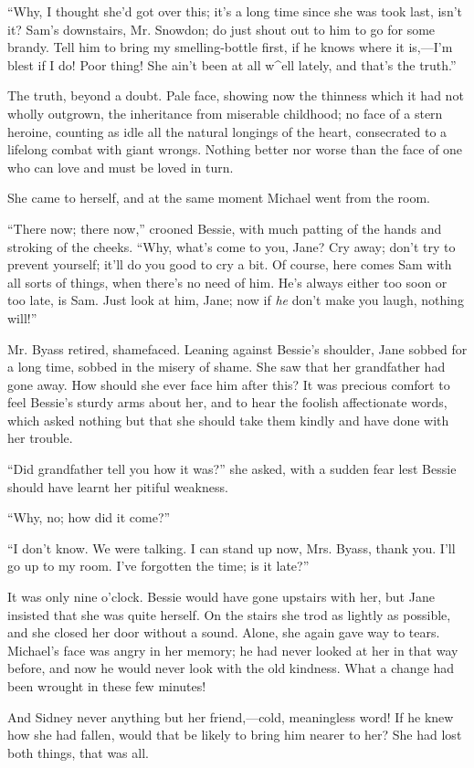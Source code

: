 ``Why, I thought she'd got over this; it's a long time since she was
took last, isn't it? Sam's downstairs, Mr. Snowdon; do just shout out to
him to go for some brandy. Tell him to bring my smelling-bottle first,
if he knows where it is,---I'm blest if I do! Poor thing! She ain't been
at all w\^{}ell lately, and that's the truth.''

The truth, beyond a doubt. Pale face, showing now the thinness which it
had not wholly outgrown, the inheritance from
{\protect\hypertarget{134}{}{}}miserable childhood; no face of a stern
heroine, counting as idle all the natural longings of the heart,
consecrated to a lifelong combat with giant wrongs. Nothing better nor
worse than the face of one who can love and must be loved in turn.

She came to herself, and at the same moment Michael went from the room.

``There now; there now,'' crooned Bessie, with much patting of the hands
and stroking of the cheeks. ``Why, what's come to you, Jane? Cry away;
don't try to prevent yourself; it'll do you good to cry a bit. Of
course, here comes Sam with all sorts of things, when there's no need of
him. He's always either too soon or too late, is Sam. Just look at him,
Jane; now if \emph{he} don't make you laugh, nothing will!''

Mr. Byass retired, shamefaced. Leaning against Bessie's shoulder, Jane
sobbed for a long time, sobbed in the misery of shame. She saw that her
grandfather had gone away. How should she ever face him after this? It
was precious comfort to feel Bessie's sturdy arms about her, and to hear
the foolish affectionate words, which asked nothing but that
{\protect\hypertarget{135}{}{}}she should take them kindly and have done
with her trouble.

``Did grandfather tell you how it was?'' she asked, with a sudden fear
lest Bessie should have learnt her pitiful weakness.

``Why, no; how did it come?''

``I don't know. We were talking. I can stand up now, Mrs. Byass, thank
you. I'll go up to my room. I've forgotten the time; is it late?''

It was only nine o'clock. Bessie would have gone upstairs with her, but
Jane insisted that she was quite herself. On the stairs she trod as
lightly as possible, and she closed her door without a sound. Alone, she
again gave way to tears. Michael's face was angry in her memory; he had
never looked at her in that way before, and now he would never look with
the old kindness. What a change had been wrought in these few minutes!

And Sidney never anything but her friend,---cold, meaningless word! If
he knew how she had fallen, would that be likely to bring him nearer to
her? She had lost both things, that was all.
